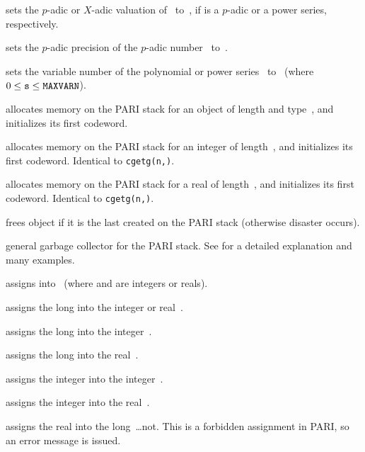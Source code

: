  sets the $p$-adic or $X$-adic valuation
of~ to~, if  is a $p$-adic or a power series,
respectively.

 sets the $p$-adic precision of the
$p$-adic number~ to~.

 sets the variable number of the polynomial
or power series~ to~ (where $0\le {\tt s}\le{\tt MAXVARN}$).



 allocates memory on the PARI stack for
an object of length  and type~, and initializes its first
codeword.

 allocates memory on the PARI stack for an
integer of length~, and initializes its first codeword. Identical to
{\tt cgetg(n,)}.

 allocates memory on the PARI stack for a real
of length~, and initializes its first codeword. Identical to
{\tt cgetg(n,)}.

 frees object  if it is the last created on the
PARI stack (otherwise disaster occurs).

 general garbage collector
for the PARI stack. See  for a detailed explanation and
many examples.


 assigns  into~ (where
 and  are integers or reals).

 assigns the long  into the integer or
real~.

 assigns the long  into the
integer~.

 assigns the long  into the
real~.

 assigns the integer  into the
integer~.

 assigns the integer  into the
real~.

 assigns the real  into the
long~\dots not. This is a forbidden assignment in PARI, so an error
message is issued.

